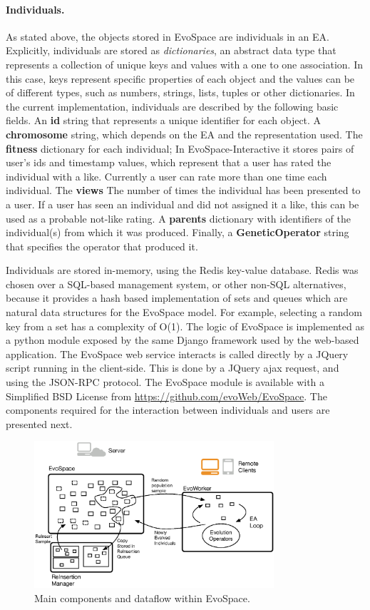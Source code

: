 \documentclass{sig-alternate}
\begin{document}
\paragraph{Individuals.}
As stated above, the objects stored in EvoSpace are individuals in an EA.
Explicitly, individuals are stored as \emph{dictionaries}, an abstract data type that represents a collection of unique keys and values with a one to one association. In this case, keys represent specific properties of each object and the values can be of different types, such as
numbers, strings, lists, tuples or other dictionaries.
In the current implementation, individuals are described by the following basic fields.
An \textbf{id} string that represents a unique identifier for each object.
A \textbf{chromosome} string, which depends on the EA and the representation used.
The \textbf{fitness} dictionary for each individual; In EvoSpace-Interactive it stores pairs of user's ids and timestamp values, which represent that a user has rated the individual with a like. Currently a user can rate more than one time each individual.
The \textbf{views} The number of times the individual has been presented to a user. If a user has seen an individual and  did not assigned it a like, this can be used as a probable not-like rating.
A \textbf{parents} dictionary with identifiers of the individual(s) from which it was produced.
Finally, a \textbf{GeneticOperator}  string that specifies the operator that produced it.   


Individuals are stored in-memory, using the Redis key-value database. Redis was chosen over a SQL-based management system, or other non-SQL alternatives, because it provides a hash based implementation of sets and queues which are natural data structures for the EvoSpace model. For example, selecting a random key from a set has a complexity of O(1). The logic of EvoSpace is implemented as a python module exposed by the same Django framework used by the web-based application. The EvoSpace web service interacts is called directly by a JQuery script running in the client-side. This is done by a JQuery ajax request, and using the  JSON-RPC protocol.  The EvoSpace module is available with a Simplified BSD License from \url{https://github.com/evoWeb/EvoSpace}.  The components required for the interaction between individuals and users are presented next.

\begin{figure}[!t]
    \centering
        \includegraphics[width=3.5in]{evospaceExample.eps}
    \caption{Main components and dataflow within EvoSpace.}
    \label{fig:evo}
\end{figure}
\end{document}
